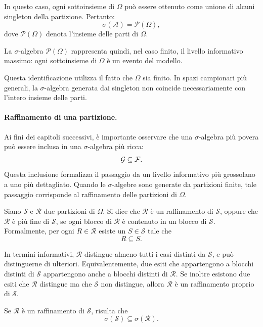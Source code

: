 In questo caso, ogni sottoinsieme di $\Omega$ pu\`{o} essere ottenuto come
unione di alcuni singleton della partizione. Pertanto:
\[
\sigma(\mathcal{A})
=
\mathcal{P}(\Omega),
\]
dove $\mathcal{P}(\Omega)$ denota l'insieme delle parti di $\Omega$.

La $\sigma$-algebra $\mathcal{P}(\Omega)$ rappresenta quindi, nel caso finito,
il livello informativo massimo: ogni sottoinsieme di $\Omega$ \`{e} un evento
del modello.

Questa identificazione utilizza il fatto che $\Omega$ sia finito. In spazi
campionari pi\`{u} generali, la $\sigma$-algebra generata dai singleton non
coincide necessariamente con l'intero insieme delle parti.


\paragraph*{Raffinamento di una partizione.}
Ai fini dei capitoli successivi, \`{e} importante osservare che una
$\sigma$-algebra pi\`{u} povera pu\`{o} essere inclusa in una
$\sigma$-algebra pi\`{u} ricca:
\[
\mathcal{G}\subseteq\mathcal{F}.
\]
Questa inclusione formalizza il passaggio da un livello informativo pi\`{u}
grossolano a uno pi\`{u} dettagliato. Quando le $\sigma$-algebre sono generate
da partizioni finite, tale passaggio corrisponde al raffinamento delle
partizioni di $\Omega$.

Siano $\mathcal{S}$ e $\mathcal{R}$ due partizioni di $\Omega$. 
Si dice che $\mathcal{R}$ \`{e} un raffinamento di $\mathcal{S}$, oppure che
$\mathcal{R}$ \`{e} pi\`{u} fine di $\mathcal{S}$, se ogni blocco di
$\mathcal{R}$ \`{e} contenuto in un blocco di $\mathcal{S}$. 
Formalmente, per ogni $R\in\mathcal{R}$ esiste un $S\in\mathcal{S}$ tale che
\[
R\subseteq S.
\]

In termini informativi, $\mathcal{R}$ distingue almeno tutti i casi distinti da
$\mathcal{S}$, e pu\`{o} distinguerne di ulteriori. Equivalentemente, due esiti
che appartengono a blocchi distinti di $\mathcal{S}$ appartengono anche a
blocchi distinti di $\mathcal{R}$. Se inoltre esistono due esiti che
$\mathcal{R}$ distingue ma che $\mathcal{S}$ non distingue, allora
$\mathcal{R}$ \`{e} un raffinamento proprio di $\mathcal{S}$.

Se $\mathcal{R}$ \`{e} un raffinamento di $\mathcal{S}$, risulta che 
\[
\sigma(\mathcal{S})\subseteq \sigma(\mathcal{R}).
\]

